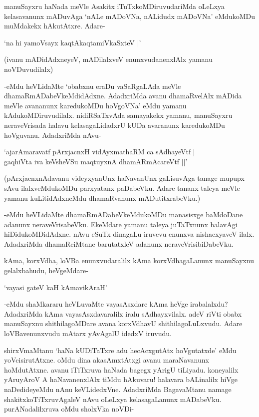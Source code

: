 manuSayxru haNada meVle Asakitx iTuTxkoMDiruvudariMda oLeLxya kelasavanunx mADuvAga `nALe mADoVNa, nALidudx mADoVNa' eMdukoMDu muMdakekx hAkutAtxre. Adare-

\begin{shloka}
`na hi yamoV\s sayx kaqtAkaqtamiVkaSxteV‌ |'
\end{shloka}

(ivanu mADidAdxneyeV, mADilalxveV enunxvudanenxlAlx yamanu noVDuvudilalx)

-eMdu heVLidaMte `obabxnu eraDu vaSaRgaLAda meVle dhamaRmADabeVkeMdidAdxne. AdadxriMda avanu dhamaRvelAlx mADida meVle avananunx karedukoMDu hoVgoVNa' eMdu yamanu kAdukoMDiruvudilalx. nidiRSaTxvAda samayakekx yamanu, manuSayxru neraveVrisada halavu kelasagaLidadxrU kUDa avaranunx karedukoMDu hoVguvanu. AdadxriMda nAvu-

\begin{shloka}
`ajarAmaravatf pArxjacnxH vidAyxmathaRM ca sAdhayeVtf |\\
gaqhiVta iva keVsheVSu maqtuyxnA dhamARmAcareVtf ||'
\end{shloka}

(pArxjacnxnAdavanu videyxyanUnx haNavanUnx gaLisuvAga tanage mupupx sAvu ilalxveMdukoMDu parxyatanx paDabeVku. Adare tananx taleya meVle yamanu kuLitidAdxneMdu dhamaRvanunx mADutitxrabeVku.)

-eMdu heVLidaMte dhamaRmADabeVkeMdukoMDu manasisxge baMdoDane adanunx neraveVrisabeVku. EkeMdare yamanu taleya juTaTxnunx balavAgi hiDidukoMDidAdxne. nAvu eSuTx dinagaLu iruvevu enunxva nishacxyaveV ilalx. AdadxriMda dhamaRciMtane barutatxleV adanunx neraveVrisibiDabeVku.

kAma, korxVdha, loVBa enunxvudaralilx kAma korxVdhagaLanunx manuSayxnu gelalxbahudu, heVgeMdare-

\begin{shloka}
`vayasi gateV kaH kAmavikAraH'
\end{shloka}

-eMdu shaMkararu heVLuvaMte vayasAsxdare kAma heVge irabalalxdu? AdadxriMda kAma vayasAsxdavaralilx iralu sAdhayxvilalx. adeV riVti obabx manuSayxnu shithilagoMDare avana korxVdhavU shithilagoLuLxvudu. Adare loVBavenunxvudu mAtarx yAvAgalU idedxV iruvudu.

shirxVmaMtanu `haNa kUDiTaTxre adu hecAcxgutAtx hoVgutatxde' eMdu yoVcisirutAtxne. oMdu dina akasAmxtAtxgi avanu maraNavanunx hoMdutAtxne. avanu iTiTxruva haNada bagegx yArigU tiLiyadu. koneyalilx yAruyAroV A haNavanenxlAlx tiMdu hAkuvaru! halavara bALinalilx hiVge naDedideyeMdu nAnu keVLidedxVne. AdadxriMda BagavaMtanu namage shakitxkoTiTxruvAgaleV nAvu oLeLxya kelasagaLanunx mADabeVku. purANadalilxruva oMdu sholxVka noVDi-

